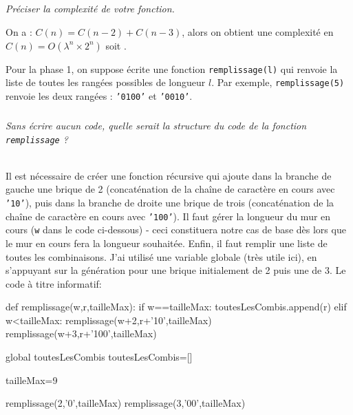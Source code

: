 \subparagraph{}\textit{Préciser la complexité de votre fonction.}
\ifprof
\begin{corrige}
On a : $C(n)=C(n-2)+C(n-3)$, alors on obtient une complexité en $C(n)=O\left(\lambda^n \times 2^{n}\right)$ soit .

\end{corrige}

Pour la phase 1, on suppose écrite une fonction \texttt{remplissage(l)} qui renvoie la liste de toutes les rangées possibles de longueur $l$. Par exemple, \texttt{remplissage(5)} renvoie les deux rangées : \texttt{'0100'} et \texttt{'0010'}.









\subparagraph{}\textit{Sans écrire aucun code, quelle serait la structure du code de la fonction \texttt{remplissage} ?}


\ifprof
\begin{corrige}~\\
Il est nécessaire de créer une fonction récursive qui ajoute dans la branche de gauche une brique de 2 (concaténation de la chaîne de caractère en cours avec \texttt{'10'}), puis dans la branche de droite une brique de trois (concaténation de la chaîne de caractère en cours avec \texttt{'100'}). Il faut gérer la longueur du mur en cours (\texttt{w} dans le code ci-dessous) - ceci constituera notre cas de base dès lors que le mur en cours fera la longueur souhaitée. Enfin, il faut remplir une liste de toutes les combinaisons. J'ai utilisé une variable globale (très utile ici), en s'appuyant sur la génération pour une brique initialement de 2 puis une de 3. Le code à titre informatif:

\begin{python}
def remplissage(w,r,tailleMax):
    if w==tailleMax:
        toutesLesCombis.append(r)
    elif w<tailleMax:
        remplissage(w+2,r+'10',tailleMax)
        remplissage(w+3,r+'100',tailleMax)
        
global toutesLesCombis
toutesLesCombis=[]

tailleMax=9
      
remplissage(2,'0',tailleMax)
remplissage(3,'00',tailleMax)
\end{python}
 \end{corrige}
\else
\fi

